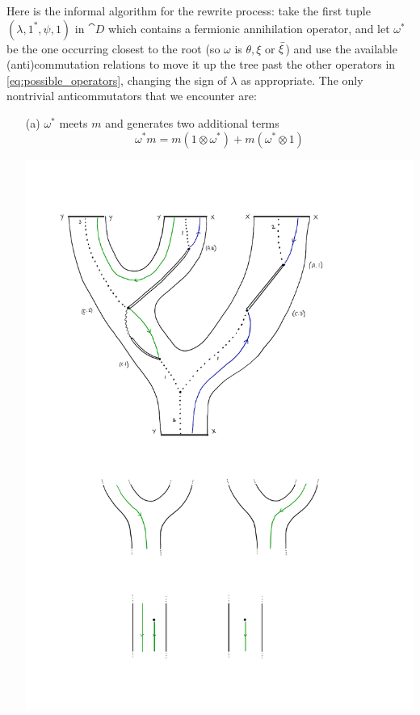 \documentclass[english,letter paper,12pt,leqno]{article}
\theoremstyle{example}
\numberwithin{equation}{section}
\begin{document}
Here is the informal algorithm for the rewrite process: take the first tuple $(\lambda, 1^*, \psi, 1)$ in $\cat{D}$ which contains a fermionic annihilation operator, and let $\omega^*$ be the one occurring closest to the root (so $\omega$ is $\theta, \xi$ or $\Bar{\xi}$) and use the available (anti)commutation relations to move it up the tree past the other operators in \eqref{eq:possible_operators}, changing the sign of $\lambda$ as appropriate. The only nontrivial anticommutators that we encounter are:
\begin{itemize}
\item[(a)] $\omega^*$ meets $m$ and generates two additional terms 
\[
\omega^* m = m( 1 \otimes \omega^* ) + m( \omega^* \otimes 1)
\]
\begin{center}
\includegraphics[scale=0.6]{dia20}
\end{center}


\end{itemize}
\end{document}
